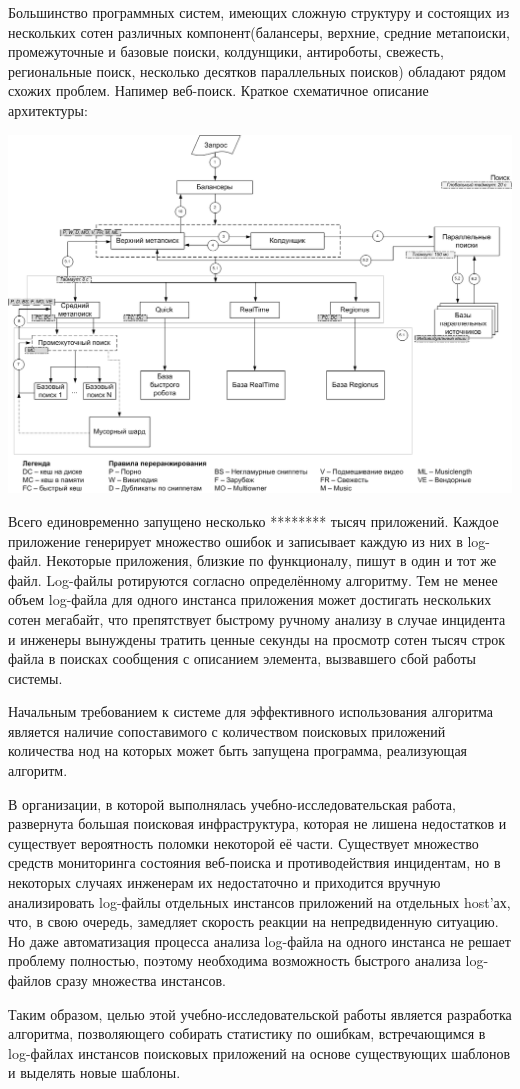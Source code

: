 Большинство программных систем, имеющих сложную структуру и состоящих из нескольких сотен различных компонент(балансеры, верхние, средние метапоиски, промежуточные и базовые поиски, колдунщики, антироботы, свежесть, региональные поиск, несколько десятков параллельных поисков) обладают рядом схожих проблем. Напимер веб-поиск. Краткое схематичное описание архитектуры:

\includegraphics[width=\textwidth]{pics/search.png}

Всего единовременно запущено несколько ******** тысяч приложений. Каждое приложение генерирует множество ошибок и записывает каждую из них в log-файл.
Некоторые приложения, близкие по функционалу, пишут в один и тот же файл. Log-файлы ротируются согласно определённому алгоритму. Тем не менее объем log-файла для одного инстанса приложения может достигать нескольких сотен мегабайт, что препятствует быстрому ручному анализу в случае инцидента и инженеры вынуждены тратить ценные секунды на просмотр сотен тысяч строк файла в поисках сообщения с описанием элемента, вызвавшего сбой работы системы.

Начальным требованием к системе для эффективного использования алгоритма является наличие сопоставимого с количеством поисковых приложений количества нод на которых может быть запущена программа, реализующая алгоритм.

В организации, в которой выполнялась учебно-исследовательская работа, развернута большая поисковая инфраструктура, которая не лишена недостатков и существует вероятность поломки некоторой её части. Существует множество средств мониторинга состояния веб-поиска и противодействия инцидентам, но в некоторых случаях инженерам их недостаточно и приходится вручную анализировать log-файлы отдельных инстансов приложений на отдельных host'ах, что, в свою очередь, замедляет скорость реакции на непредвиденную ситуацию. Но даже автоматизация процесса анализа log-файла на одного инстанса не решает проблему полностью, поэтому необходима возможность быстрого анализа log-файлов сразу множества инстансов.

Таким образом, целью этой учебно-исследовательской работы является разработка алгоритма, позволяющего собирать статистику по ошибкам, встречающимся в log-файлах инстансов поисковых приложений на основе существующих шаблонов и выделять новые шаблоны.
